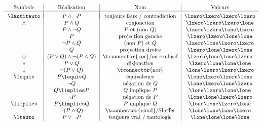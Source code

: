 \documentclass[11pt,class=report,crop=false]{standalone}
\begin{document}
\[
\begin{tabular}{c|c|c|c}
	Symbole & Réalisation & Nom & Valeurs \\
	\hline
	& \\[-2ex]
		
	$\lantitauto$  & $ P \land \lnot P$ & toujours faux / contradiction & \lzero\lzero\lzero\lzero \\  %
	
	$\land$ & $P \land Q$ & conjonction & \lzero\lzero\lzero\lone \\         %
	
	      & $P \land \lnot Q$ & $P$ et (non $Q$) & \lzero\lzero\lone\lzero \\ %
	
	     & $P$ & projection gauche & \lzero\lzero\lone\lone \\             %
	
	      & $\lnot P \land Q$ & (non $P$) et $Q$ & \lzero\lone\lzero\lzero \\ %
	
	     & $Q$ & projection droite & \lzero\lone\lzero\lone \\              %
	
	$\oplus$ & $(P \lor Q) \land \lnot(P\land Q)$ & \tconnector{xor}/ou exclusif & \lzero\lone\lone\lzero \\ %
	
	$\lor$ & $P \lor Q$ & disjonction & \lzero\lone\lone\lone \\           %
	
	$\downarrow$ & $\lnot(P \lor Q)$ & \tconnector{nor} & \lone\lzero\lzero\lzero \\ %
	
	$\lequiv$ & $P \lequiv Q$ & équivalence & \lone\lzero\lzero\lone \\ %
	
	 & $\lnot Q$ & négation de $Q$ & \lone\lzero\lone\lzero \\          %
	
	      & $Q \limplies P$ & $Q$ implique $P$ & \lone\lzero\lone\lone \\ %
	
	 & $\lnot P$ & négation de $P$ & \lone\lone\lzero\lzero \\          %
	
	$\limplies$      & $ P \limplies Q$ & $P$ implique $Q$ & \lone\lone\lzero\lone \\ %
	
	$\uparrow$ & $\lnot(P \land Q)$ & \tconnector{nand}/Sheffer & \lone\lone\lone\lzero \\ %
	
	$\ltauto$ & $P \lor \lnot P$ & toujours vrai / tautologie & \lone\lone\lone\lone \\ %
	
\end{tabular}
\]
\end{document}
